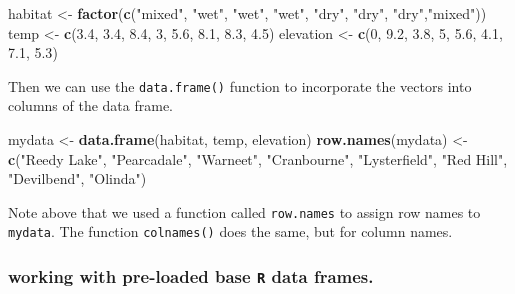 \documentclass[]{book}
\newenvironment{Shaded}{\begin{snugshade}}{\end{snugshade}}
\newcommand{\DecValTok}[1]{\textcolor[rgb]{0.00,0.00,0.81}{#1}}
\newcommand{\FloatTok}[1]{\textcolor[rgb]{0.00,0.00,0.81}{#1}}
\newcommand{\KeywordTok}[1]{\textcolor[rgb]{0.13,0.29,0.53}{\textbf{#1}}}
\newcommand{\NormalTok}[1]{#1}
\newcommand{\StringTok}[1]{\textcolor[rgb]{0.31,0.60,0.02}{#1}}
\begin{document}
\begin{Shaded}
\begin{Highlighting}[]
\NormalTok{habitat <-}\StringTok{ }\KeywordTok{factor}\NormalTok{(}\KeywordTok{c}\NormalTok{(}\StringTok{"mixed"}\NormalTok{, }\StringTok{"wet"}\NormalTok{, }\StringTok{"wet"}\NormalTok{, }\StringTok{"wet"}\NormalTok{, }\StringTok{"dry"}\NormalTok{, }\StringTok{"dry"}\NormalTok{, }\StringTok{"dry"}\NormalTok{,}\StringTok{"mixed"}\NormalTok{))}
\NormalTok{temp <-}\StringTok{ }\KeywordTok{c}\NormalTok{(}\FloatTok{3.4}\NormalTok{, }\FloatTok{3.4}\NormalTok{, }\FloatTok{8.4}\NormalTok{, }\DecValTok{3}\NormalTok{, }\FloatTok{5.6}\NormalTok{, }\FloatTok{8.1}\NormalTok{, }\FloatTok{8.3}\NormalTok{, }\FloatTok{4.5}\NormalTok{)}
\NormalTok{elevation <-}\StringTok{ }\KeywordTok{c}\NormalTok{(}\DecValTok{0}\NormalTok{, }\FloatTok{9.2}\NormalTok{, }\FloatTok{3.8}\NormalTok{, }\DecValTok{5}\NormalTok{, }\FloatTok{5.6}\NormalTok{, }\FloatTok{4.1}\NormalTok{, }\FloatTok{7.1}\NormalTok{, }\FloatTok{5.3}\NormalTok{)}
\end{Highlighting}
\end{Shaded}

Then we can use the \texttt{data.frame()} function to incorporate the vectors into columns of the data frame.

\begin{Shaded}
\begin{Highlighting}[]
\NormalTok{mydata <-}\StringTok{ }\KeywordTok{data.frame}\NormalTok{(habitat, temp, elevation)}
\KeywordTok{row.names}\NormalTok{(mydata) <-}\StringTok{ }\KeywordTok{c}\NormalTok{(}\StringTok{"Reedy Lake"}\NormalTok{, }\StringTok{"Pearcadale"}\NormalTok{, }\StringTok{"Warneet"}\NormalTok{, }\StringTok{"Cranbourne"}\NormalTok{, }
                       \StringTok{"Lysterfield"}\NormalTok{, }\StringTok{"Red Hill"}\NormalTok{, }\StringTok{"Devilbend"}\NormalTok{, }\StringTok{"Olinda"}\NormalTok{)}
\end{Highlighting}
\end{Shaded}

Note above that we used a function called \texttt{row.names} to assign row names to \texttt{mydata}. The function \texttt{colnames()} does the same, but for column names.

\hypertarget{working-with-pre-loaded-base-r-data-frames.}{%
\subsubsection{\texorpdfstring{working with pre-loaded base \texttt{R} data frames.}{working with pre-loaded base R data frames.}}\label{working-with-pre-loaded-base-r-data-frames.}}
\end{document}
